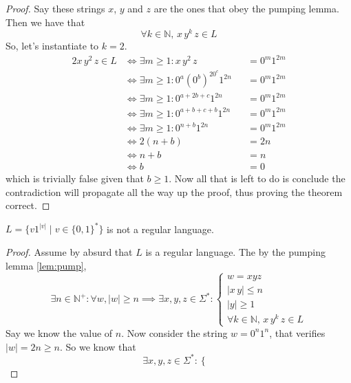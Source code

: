 \documentclass[docid=TP07]{tcom_TP}
\begin{document}
{\begin{proof}
Say these strings $x$, $y$ and $z$ are the ones that obey the pumping lemma. Then we have that
\begin{equation*}
	\forall k \in \mathbb{N},\,x\,y^k\,z \in L
\end{equation*}
So, let's instantiate to $k=2$.
\begin{alignat*}{2}
	x\,y^2\,z \in L
	& \iff \exists m \geq 1 \colon x\,y^2\,z           &&= 0^m1^{2m} \\
	& \iff \exists m \geq 1 \colon 0^a(0^b)^20^c1^{2n} &&= 0^m1^{2m} \\
	& \iff \exists m \geq 1 \colon 0^{a+2b+c}1^{2n}    &&= 0^m1^{2m} \\
	& \iff \exists m \geq 1 \colon 0^{a+b+c+b}1^{2n}   &&= 0^m1^{2m} \\
	& \iff \exists m \geq 1 \colon 0^{n+b}1^{2n}       &&= 0^m1^{2m} \\
	& \iff 2(n+b)                                      &&= 2n\\
	& \iff n+b                                         &&= n\\
	& \iff b                                           &&= 0
\end{alignat*}
which is trivially false given that $b \geq 1$. Now all that is left to do is conclude the contradiction will propagate all the way up the proof, thus proving the theorem correct.
\end{proof}
\pagebreak
{}
\begin{theorem}
$L=\{v1^{|v|}\mid v \in \{0,1\}^*\}$ is not a regular language.
\end{theorem}
\begin{proof}
Assume  by absurd that $L$ is a regular language. The by the pumping lemma \eqref{lem:pump},
\begin{equation*}
	\exists n \in \mathbb{N}^+ \colon \forall w, |w|\geq n \implies \exists x, y, z \in \Sigma^* \colon 
	\begin{cases}
		w = xyz \\
		|x\,y| \leq n\\
		|y| \geq 1\\
		\forall k \in \mathbb{N},\,x\,y^k\,z \in L
\end{cases}
\end{equation*}
Say we know the value of $n$. Now consider the string $w=0^n1^n$, that verifies $|w|=2n \geq n$. So we know that
\begin{equation*}
\exists x, y, z \in \Sigma^* \colon 
\begin{cases}

\end{cases}
\end{equation*}
\end{proof}}
\end{document}
